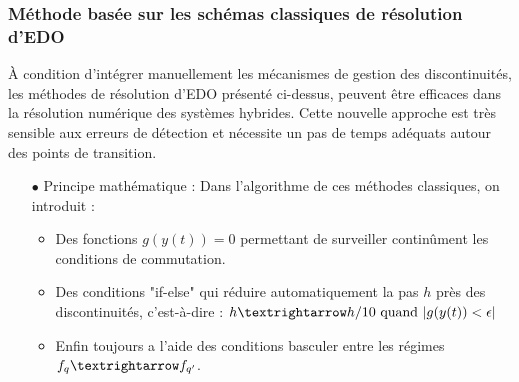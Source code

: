 \documentclass[12pt, oneside]{report} %
\theoremstyle{definition}
\theoremstyle{remark}
\begin{document}
\subsubsection{Méthode basée sur les schémas classiques de résolution d'EDO}
À condition d'intégrer manuellement les mécanismes de gestion des discontinuités, les méthodes de résolution d'EDO présenté ci-dessus, peuvent être efficaces dans la résolution numérique des systèmes hybrides. Cette nouvelle approche est très sensible aux erreurs de détection et nécessite un pas de temps adéquats autour des points de transition.
\begin{itemize}
	
	\item[$\bullet$] {Principe mathématique : } Dans l'algorithme de ces méthodes classiques, on introduit : 
	\begin{itemize}
		\item Des fonctions $g(y(t)) = 0 $ permettant de surveiller continûment les conditions de commutation. 
		\item Des conditions "if-else" qui réduire automatiquement la pas $h$ près des discontinuités, c'est-à-dire : $h \textrightarrow h/10 \text{ quand } |g(y(t))< \epsilon|$
		\item Enfin toujours a l'aide des conditions basculer entre les régimes ${f}_q \textrightarrow f_{q'}$.
	\end{itemize}


		
		


\end{itemize}
\end{document}
